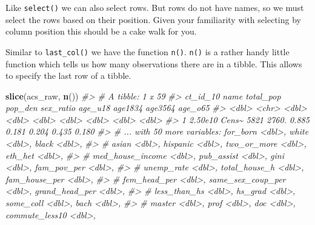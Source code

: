 \documentclass[
]{book}
\newenvironment{Shaded}{\begin{snugshade}}{\end{snugshade}}
\newcommand{\CommentTok}[1]{\textcolor[rgb]{0.56,0.35,0.01}{\textit{#1}}}
\newcommand{\KeywordTok}[1]{\textcolor[rgb]{0.13,0.29,0.53}{\textbf{#1}}}
\newcommand{\NormalTok}[1]{#1}
\begin{document}
Like \texttt{select()} we can also select rows. But rows do not have names, so we must select the rows based on their position. Given your familiarity with selecting by column position this should be a cake walk for you.

Similar to \texttt{last\_col()} we have the function \texttt{n()}. \texttt{n()} is a rather handy little function which tells us how many observations there are in a tibble. This allows to specify the last row of a tibble.

\begin{Shaded}
\begin{Highlighting}[]
\KeywordTok{slice}\NormalTok{(acs\_raw, }\KeywordTok{n}\NormalTok{())}
\CommentTok{\#\textgreater{} \# A tibble: 1 x 59}
\CommentTok{\#\textgreater{}   ct\_id\_10 name  total\_pop pop\_den sex\_ratio age\_u18 age1834 age3564 age\_o65}
\CommentTok{\#\textgreater{}      \textless{}dbl\textgreater{} \textless{}chr\textgreater{}     \textless{}dbl\textgreater{}   \textless{}dbl\textgreater{}     \textless{}dbl\textgreater{}   \textless{}dbl\textgreater{}   \textless{}dbl\textgreater{}   \textless{}dbl\textgreater{}   \textless{}dbl\textgreater{}}
\CommentTok{\#\textgreater{} 1  2.50e10 Cens\textasciitilde{}      5821   2760.     0.885   0.181   0.204   0.435   0.180}
\CommentTok{\#\textgreater{} \# ... with 50 more variables: for\_born \textless{}dbl\textgreater{}, white \textless{}dbl\textgreater{}, black \textless{}dbl\textgreater{},}
\CommentTok{\#\textgreater{} \#   asian \textless{}dbl\textgreater{}, hispanic \textless{}dbl\textgreater{}, two\_or\_more \textless{}dbl\textgreater{}, eth\_het \textless{}dbl\textgreater{},}
\CommentTok{\#\textgreater{} \#   med\_house\_income \textless{}dbl\textgreater{}, pub\_assist \textless{}dbl\textgreater{}, gini \textless{}dbl\textgreater{}, fam\_pov\_per \textless{}dbl\textgreater{},}
\CommentTok{\#\textgreater{} \#   unemp\_rate \textless{}dbl\textgreater{}, total\_house\_h \textless{}dbl\textgreater{}, fam\_house\_per \textless{}dbl\textgreater{},}
\CommentTok{\#\textgreater{} \#   fem\_head\_per \textless{}dbl\textgreater{}, same\_sex\_coup\_per \textless{}dbl\textgreater{}, grand\_head\_per \textless{}dbl\textgreater{},}
\CommentTok{\#\textgreater{} \#   less\_than\_hs \textless{}dbl\textgreater{}, hs\_grad \textless{}dbl\textgreater{}, some\_coll \textless{}dbl\textgreater{}, bach \textless{}dbl\textgreater{},}
\CommentTok{\#\textgreater{} \#   master \textless{}dbl\textgreater{}, prof \textless{}dbl\textgreater{}, doc \textless{}dbl\textgreater{}, commute\_less10 \textless{}dbl\textgreater{},}

\end{Highlighting}
\end{Shaded}
\end{document}
